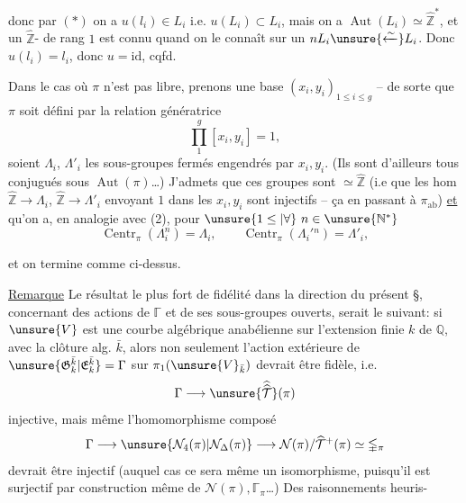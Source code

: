 
donc par $(*)$ on a $u(l_i)\in L_i$ i.e. $u(L_i)\subset L_i$,
mais on a $\operatorname{Aut}(L_i)\simeq\widehat{\mathbb Z}^{*}$, et un
  
$\widehat{\mathbb Z}$-  de rang $1$
 est connu quand on le connaît
sur un $nL_i\unsure{\xleftarrow{\sim}}L_i$.
Donc  $u(l_i)=l_i$,
donc $u=\mathrm{id}$, cqfd.

Dans le cas où $\pi$ n'est pas libre,
prenons une  base $(x_i,y_i)_{1\leq i\leq g}$
-- de sorte que $\pi$ soit défini par la relation génératrice
\[
\tag{3} \prod_1^g[x_i,y_i]=1,
\]
soient $\Lambda_i$, $\Lambda'_i$ les sous-groupes fermés
engendrés par $x_i,y_i$.
 (Ils sont d'ailleurs tous conjugués sous
$\operatorname{Aut}(\pi)$\ldots) J'admets que ces groupes
sont $\simeq\widehat{\mathbb Z}$ (i.e que les hom
 $\widehat{\mathbb Z}\longrightarrow\Lambda_i$,
$\widehat{\mathbb Z}\longrightarrow\Lambda'_i$ envoyant $1$ dans les
$x_i,y_i$ sont injectifs -- ça 
 en passant à $\pi_{\mathrm{ab}}$)
\uline{et} qu'on a, en analogie avec (2), pour
$\unsure{1\leq|\forall}\ n\in\unsure{\mathbb N^{*}}$
\[
\tag{4}
\operatorname{Centr}_{\pi}(\Lambda_i^n)=\Lambda_i,\qquad
\operatorname{Centr}_{\pi}(\Lambda_i'{}^n)=\Lambda'_i,
\]


et on termine comme ci-dessus.

\uline{Remarque} Le résultat le plus fort de
fidélité dans la direction du présent
\S, concernant des actions de $\mathbb{\Gamma}$ et de
ses sous-groupes ouverts, serait le
suivant: si $\unsure{V}$ est une courbe
algébrique anabélienne sur l'extension
finie $k$ de $\mathbb Q$, avec la clôture alg. $\bar k$,
alors non seulement l'action extérieure
de $\unsure{\mathfrak G_k^{\bar k}|\mathfrak E_k^{\bar k}}=\Gamma$ sur
$\pi_1(\unsure{V}_{\bar k})$ devrait être
fidèle, i.e.
\[
\Gamma\longrightarrow\unsure{\widehat{\widehat{\mathcal T}}}(\pi)
\]
injective, mais même l'homomorphisme
composé
\[
\Gamma\longrightarrow
\unsure{\mathcal N_4(\pi)|\mathcal N_{\Delta}(\pi)}
\longrightarrow\mathcal N(\pi)/\widehat{\mathcal T}^{+}(\pi)
\simeq\mathbb{\Gamma}_{\pi}
\]
devrait être injectif (auquel cas ce sera
même un isomorphisme, puisqu'il est
surjectif par construction même de
$\mathcal N(\pi),\mathbb{\Gamma}_{\pi}$\ldots)
Des raisonnements heuris-

